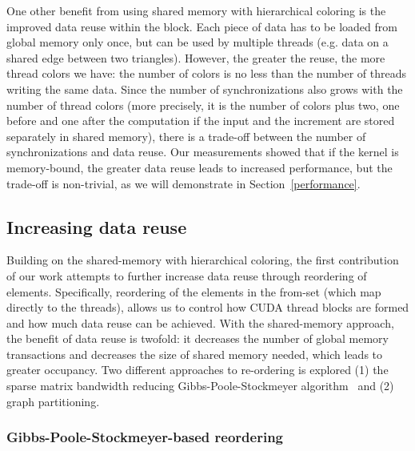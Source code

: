 One other benefit from using shared memory with hierarchical coloring is the 
improved data reuse within the block. Each piece of data has to be loaded 
from global memory only once, but can be used by multiple threads (e.g. data on 
a shared edge between two triangles). However, the greater the reuse, the more 
thread colors we have: the number of colors is no less than the number of 
threads writing the same data. Since the number of synchronizations also grows 
with the number of thread colors (more precisely, it is the number of colors 
plus two, one before and one after the computation if the input and the 
increment are stored separately in shared memory), there is a trade-off between 
the number of synchronizations and data reuse. Our measurements showed that if 
the kernel is memory-bound, the greater data reuse leads to increased 
performance, but the trade-off is non-trivial, as we will demonstrate in 
Section~\ref{performance}.

\subsection{Increasing data reuse}\label{increasing-data-reuse}
\noindent Building on the shared-memory with hierarchical coloring, the first 
contribution of our work attempts to further increase data reuse through 
reordering of elements. Specifically, reordering of the elements in the
from-set (which map directly to the threads), allows us to control 
how CUDA thread blocks are formed and how much data reuse can be achieved. 
With the shared-memory approach, the benefit of data reuse is twofold: it 
decreases the number of global memory transactions and decreases the size of 
shared memory needed, which leads to greater occupancy. Two different 
approaches to re-ordering is explored (1) the sparse matrix bandwidth reducing 
Gibbs-Poole-Stockmeyer algorithm~\cite{gps} and (2) graph partitioning.


\subsubsection{Gibbs-Poole-Stockmeyer-based reordering}

